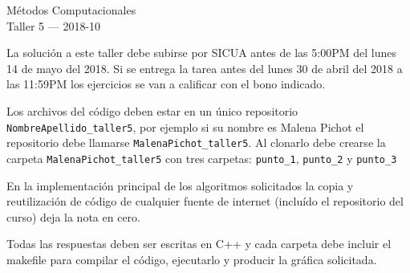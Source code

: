 \documentclass[11pt,letterpaper]{exam}
\begin{document}
\begin{center}
{\Large Métodos Computacionales} \\
Taller 5 --- 2018-10\\

\end{center}


\vspace{0.3cm}

\noindent
La solución a este taller debe subirse por SICUA antes de las 5:00PM
del lunes 14 de mayo del 2018. 
Si se entrega la tarea antes del lunes 30 de abril del 2018 a las
11:59PM los ejercicios se van a calificar con el bono indicado. 
\noindent

\vspace{0.3cm}
Los archivos del c\'odigo  deben estar en un \'unico repositorio 
\verb"NombreApellido_taller5", por ejemplo si su nombre es Malena
Pichot el repositorio debe llamarse \verb"MalenaPichot_taller5". 
Al clonarlo debe crearse la carpeta \verb"MalenaPichot_taller5"
con tres carpetas: \verb"punto_1", \verb"punto_2" y \verb"punto_3"

En la implementaci\'on principal de los algoritmos solicitados la
copia y reutilizaci\'on de c\'odigo de cualquier fuente de internet
(inclu\'ido el repositorio del curso) deja la nota en cero.  

Todas las respuestas deben ser escritas en C++ y cada carpeta debe
incluir el makefile para compilar el c\'odigo, ejecutarlo y producir
la gr\'afica solicitada.
\end{document}

